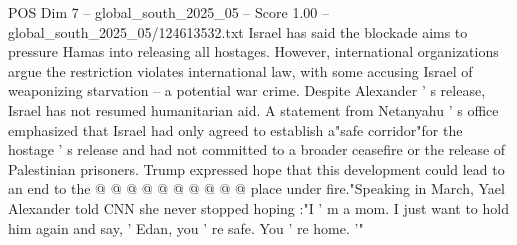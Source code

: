 \begin{textsample}{POS Dim 7 – global\_south\_2025\_05 – Score 1.00 – global\_south\_2025\_05/124613532.txt}
Israel has said the blockade aims to pressure Hamas into releasing all hostages.
However, international organizations argue the restriction violates international law, with some accusing Israel of weaponizing starvation -- a potential war crime.
Despite Alexander ' s release, Israel has not resumed humanitarian aid.
A statement from Netanyahu ' s office emphasized that Israel had only agreed to establish a"safe corridor"for the hostage ' s release and had not committed to a broader ceasefire or the release of Palestinian prisoners.
Trump expressed hope that this development could lead to an end to the @ @ @ @ @ @ @ @ @ @ place under fire."Speaking in March, Yael Alexander told CNN she never stopped hoping :"I ' m a mom.
I just want to hold him again and say, ' Edan, you ' re safe.
You ' re home. '"

\end{textsample}
